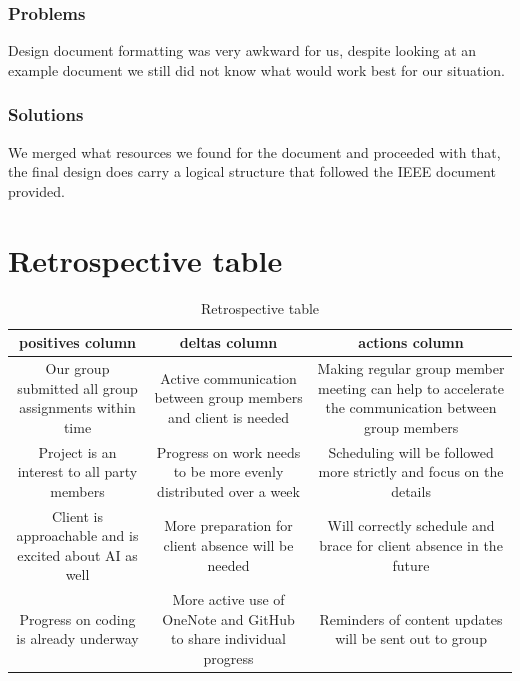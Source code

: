 \documentclass[onecolumn, draftclsnofoot,10pt, compsoc]{IEEEtran}
\begin{document}
\subsubsection{Problems}
Design document formatting was very awkward for us, despite looking at an example document we still did not know what would work best for our situation.

\subsubsection{Solutions}
We merged what resources we found for the document and proceeded with that, the final design does carry a logical structure that followed the IEEE document provided.

\section{Retrospective table}
\begin{table}[h]
\centering
\begin{tabular}{ | c | c | c |}
\hline
positives column & deltas column & actions column\\ 
\hline
Our group submitted all group assignments within time & Active communication between group members and client is needed & Making regular group member meeting can help to accelerate the communication between group members \\ 
\hline
Project is an interest to all party members & Progress on work needs to be more evenly distributed over a week & Scheduling will be followed more strictly and focus on the details\\ 
\hline
Client is approachable and is excited about AI as well & More preparation for client absence will be needed & Will correctly schedule and brace for client absence in the future\\ 
\hline
Progress on coding is already underway & More active use of OneNote and GitHub to share individual progress & Reminders of content updates will be sent out to group\\ 
\hline
\end{tabular}
\caption{Retrospective table}
\label{table:1}
\end{table}
\end{document}
